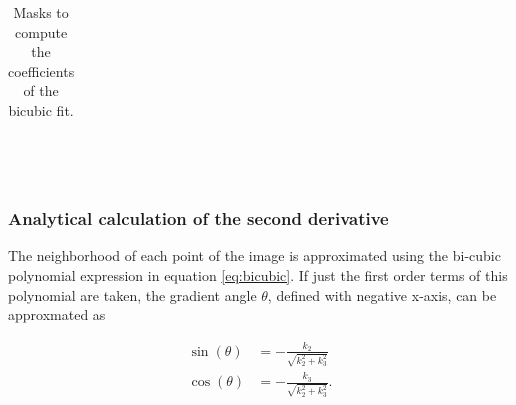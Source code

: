\documentclass{ipol}
\numberwithin{equation}{section}
\numberwithin{table}{section}
\numberwithin{figure}{section}
\begin{document}
\begin{table}
{\begin{tabular}{|*{5}{C|}}
\hline
\end{tabular}} \\
\qquad\qquad
{} \\
\caption{Masks to compute the coefficients of the bicubic fit.}
\label{table:b_i}
\end{table}


\subsubsection{Analytical calculation of the second derivative}
\label{sec:secderivative}

The neighborhood of each point of the image is approximated using the bi-cubic polynomial 
expression in equation \ref{eq:bicubic}. If just the first order terms of this 
polynomial are taken, the gradient angle $\theta$, defined with negative x-axis, can be approxmated as

\begin{align}
\label{eq:sincos}
	\sin(\theta) & = -\frac{k_2}{\sqrt{k_2^2 + k_3^2}} \nonumber \\
	\cos(\theta) & = -\frac{k_3}{\sqrt{k_2^2 + k_3^2}}. \nonumber \\
\end{align}
\end{document}
